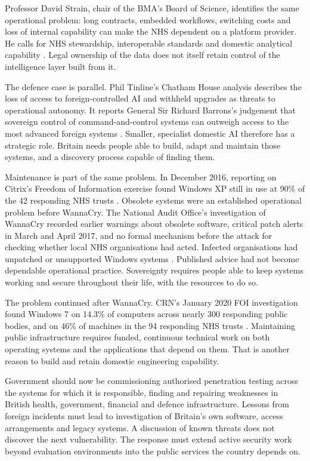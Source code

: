 Professor David Strain, chair of the BMA's Board of Science, identifies the
same operational problem: long contracts, embedded workflows, switching
costs and loss of internal capability can make the NHS dependent on a
platform provider. He calls for NHS stewardship, interoperable standards
and domestic analytical capability \cite{bmasovereignty2026}. Legal ownership
of the data does not itself retain control of the intelligence layer built
from it.

The defence case is parallel. Phil Tinline's Chatham House analysis
describes the loss of access to foreign-controlled AI and withheld upgrades
as threats to operational autonomy. It reports General Sir Richard
Barrons's judgement that sovereign control of command-and-control systems
can outweigh access to the most advanced foreign systems
\cite{tinline2026killswitch}. Smaller, specialist domestic AI therefore has
a strategic role. Britain needs people able to build, adapt and maintain
those systems, and a discovery process capable of finding them.

Maintenance is part of the same problem. In December 2016, reporting on
Citrix's Freedom of Information exercise found Windows XP still in use
at 90\% of the 42 responding NHS trusts \cite{nhsxp2016}. Obsolete systems
were an established operational problem before WannaCry.
The National Audit Office's
investigation of WannaCry recorded earlier warnings about obsolete
software, critical patch alerts in March and April 2017, and no formal
mechanism before the attack for checking whether local NHS organisations
had acted. Infected organisations had unpatched or unsupported Windows
systems \cite{naowannacry}. Published advice had not become dependable
operational practice. Sovereignty requires people able to keep systems
working and secure throughout their life, with the resources to do so.

The problem continued after WannaCry. CRN's January 2020 FOI investigation
found Windows 7 on 14.3\% of computers across nearly 300 responding public
bodies, and on 46\% of machines in the 94 responding NHS trusts
\cite{crnwindows2020}. Maintaining public infrastructure requires funded,
continuous technical work on both operating systems and the applications
that depend on them. That is another reason to build and retain domestic
engineering capability.

Government should now be commissioning authorised penetration testing
across the systems for which it is responsible, finding and repairing
weaknesses in British health, government, financial and defence
infrastructure. Lessons from foreign incidents must lead to investigation
of Britain's own software, access arrangements and legacy systems. A
discussion of known threats does not discover the next vulnerability.
The response must extend active security work beyond evaluation
environments into the public services the country depends on.

